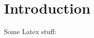 
\chapter{Introduction}\label{chapter:introduction}

\begin{comment}
\begin{itemize}
    \item So far, there is no comprehensive characterization of games that are “learn- able,” but there are some important results. For example, it is well-known that no-regret dynamics converge to a coarse correlated equilibrium in arbitrary fi- nite games [17,26,15,12]. Coarse correlated equilibria (CCE) encompass the set of correlated equilibria (CE) of a finite game. The latter is a nonempty convex polytope which in turn contains the convex hull of the game’s Nash equilibria such that we get NE subset CE subset CCE. (ComputingBNE, p.3)
    \item investigate the question whether NE is learnable via nor regret dynamics \cite{jafari} Introduction
    \item What is the outcome of multi agent learning via no regret algorithms in repeated games? A learning algorithm is said to exhibit no regret iff average payoffs that are achieved by the algorithm exceed tha payoffs that could be achieved by any fixed strategy. in the limit. \cite{jafari} Introduction
    \item best response dynamics like fictitious play does not converge to NE in general  because rational play yields deterministic play. Therefore rational play can not possibly converge to NE in games where no PNE exist. In contrast no regret dynamics are recipes by which to update probabilities that agents assaign to actions could potentially learn MNEs. 
    \item under FoReL only \textit{strict Nash equilibria} survive. 
    
    \item maybe divide in Problem and Contribution
    
    \item There is an unfortunate disconnect between game
    theory and optimization in terms of how objectives are formulated. In optimization,
    the objective is to minimize the incurred cost; in game theory, to maximize one’s rewards. In turn, this creates a clash of terminology when referring to methods such as
    “gradient descent” or “mirror descent” in a maximization setting. To avoid going against
    the traditions of each field, we keep the usual conventions in place (minimization in
    optimization, maximization in game theory), and we rely on the reader to make the
    mental substitution of “descent” to “ascent” when needed (merthabili p.4)
    
    \item we focus on learning via “dual averaging”, a widely used class of no-regret learning schemes where players take small steps along their individual payoff gradients and then “mirror” the output back to their action sets \cite[abstract]{mertikopoulos}
\end{itemize}
\end{comment}

Some Latex stuff: \\







